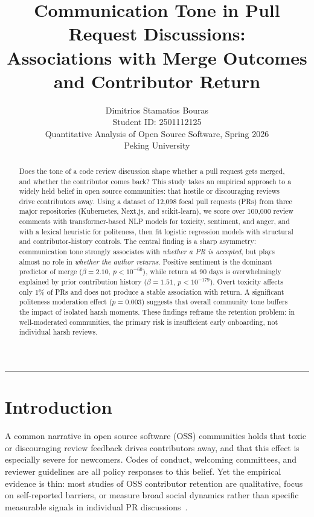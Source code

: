 \documentclass[12pt,a4paper]{article}
\title{\textbf{Communication Tone in Pull Request Discussions:\\
Associations with Merge Outcomes and Contributor Return}}
\author{Dimitrios Stamatios Bouras \\
        Student ID: 2501112125 \\[2pt]
        \small Quantitative Analysis of Open Source Software, Spring 2026 \\
        \small Peking University}
\date{}
\begin{document}
\maketitle
\thispagestyle{empty}

\begin{abstract}
\noindent
Does the tone of a code review discussion shape whether a pull request gets merged, and whether the contributor comes back? This study takes an empirical approach to a widely held belief in open source communities: that hostile or discouraging reviews drive contributors away. Using a dataset of 12,098 focal pull requests (PRs) from three major repositories (Kubernetes, Next.js, and scikit-learn), we score over 100,000 review comments with transformer-based NLP models for toxicity, sentiment, and anger, and with a lexical heuristic for politeness, then fit logistic regression models with structural and contributor-history controls. The central finding is a sharp asymmetry: communication tone strongly associates with \emph{whether a PR is accepted}, but plays almost no role in \emph{whether the author returns}. Positive sentiment is the dominant predictor of merge ($\beta = 2.10$, $p < 10^{-60}$), while return at 90 days is overwhelmingly explained by prior contribution history ($\beta = 1.51$, $p < 10^{-179}$). Overt toxicity affects only 1\% of PRs and does not produce a stable association with return. A significant politeness moderation effect ($p = 0.003$) suggests that overall community tone buffers the impact of isolated harsh moments. These findings reframe the retention problem: in well-moderated communities, the primary risk is insufficient early onboarding, not individual harsh reviews.
\end{abstract}

\hrule
\vspace{0.5em}

\section{Introduction}

A common narrative in open source software (OSS) communities holds that toxic or discouraging review feedback drives contributors away, and that this effect is especially severe for newcomers. Codes of conduct, welcoming committees, and reviewer guidelines are all policy responses to this belief. Yet the empirical evidence is thin: most studies of OSS contributor retention are qualitative, focus on self-reported barriers, or measure broad social dynamics rather than specific measurable signals in individual PR discussions~\cite{steinmacher2015, tourani2017}.
\end{document}
